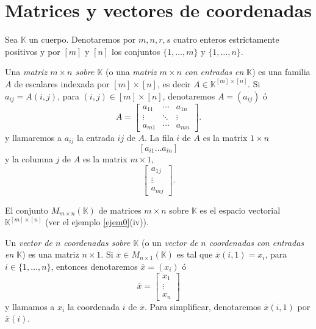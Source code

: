 \section{Matrices y vectores de coordenadas}

Sea $\mathbb{K}$ un cuerpo. Denotaremos por $m,n,r,s$ cuatro enteros estrictamente positivos y por $[m]$ y $[n]$ los conjuntos $\{1,\ldots,m\}$ y $\{1,\ldots,n\}$.

\begin{defn}
Una \emph{matriz $m\times n$ sobre $\mathbb{K}$} (o una \emph{matriz $m\times n$ con entradas en $\mathbb{K}$}) es una familia $A$ de escalares indexada por $[m]\times [n]$, es decir $A\in \mathbb{K}^{[m]\times [n]}$. Si $a_{ij}=A(i,j)$, para $(i,j)\in [m]\times [n]$, denotaremos $A=(a_{ij})$ \'o
$$ A=\left[\begin{array}{ccc}
a_{11} & \cdots & a_{1n}\\
\vdots & \ddots & \vdots\\
a_{m1} & \cdots & a_{mn}
\end{array}\right].$$
y llamaremos a $a_{ij}$ la entrada $ij$ de $A$. La fila $i$ de $A$ es la matrix $1\times n$
$$\left[a_{i1}\ldots a_{in}\right]$$
y la columna $j$ de $A$ es la matrix $m\times 1$,
$$ \left[\begin{array}{c}
a_{1j}\\
\vdots\\
a_{mj}
\end{array}\right].$$

El conjunto $M_{m\times n}(\mathbb{K})$ de matrices $m\times n$ sobre $\mathbb{K}$ es el espacio vectorial $\mathbb{K}^{[m]\times [n]}$ (ver el ejemplo \ref{ejem0}(iv)).
\end{defn}

\begin{defn}
Un \emph{vector de $n$ coordenadas sobre $\mathbb{K}$}  (o un \emph{vector de $n$ coordenadas con entradas en $\mathbb{K}$}) es una matriz $n\times 1$. Si $\overline{x}\in M_{n\times 1}(\mathbb{K})$ es tal que $\overline{x}(i,1)=x_i$, para $i\in\{1,\ldots,n\}$, entonces denotaremos $\overline{x}=(x_i)$ \'o
$$ \overline{x}=\left[\begin{array}{c}
x_{1}\\
\vdots\\
x_{n}
\end{array}\right]$$
y llamamos a $x_i$ la coordenada $i$ de $\overline{x}$. Para simplificar, denotaremos $\overline{x}(i,1)$ por $\overline{x}(i)$.
\end{defn}

